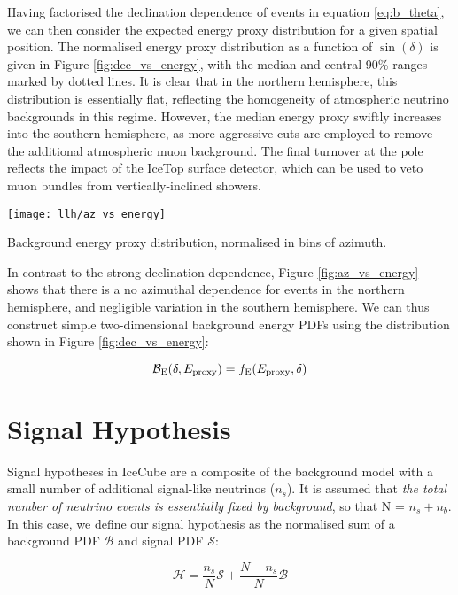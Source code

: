 Having factorised the declination dependence of events in equation \ref{eq:b_theta}, we can then consider the expected energy proxy distribution for a given spatial position. The normalised energy proxy distribution as a function of $\sin(\delta)$ is given in Figure \ref{fig:dec_vs_energy}, with the median and central 90\% ranges marked by dotted lines. It is clear that in the northern hemisphere, this distribution is essentially flat, reflecting the homogeneity of atmospheric neutrino backgrounds in this regime. However, the median energy proxy swiftly increases into the southern hemisphere, as more aggressive cuts are employed to remove the additional atmospheric muon background. The final turnover at the pole reflects the impact of the IceTop surface detector, which can be used to veto muon bundles from vertically-inclined showers.

\begin{marginfigure}
	\centering \texttt{[image: llh/az\_vs\_energy]}
	\caption{Background energy proxy distribution, normalised in bins of azimuth.}
	\label{fig:az_vs_energy}
\end{marginfigure}

In contrast to the strong declination dependence, Figure \ref{fig:az_vs_energy} shows that there is a no azimuthal dependence for events in the northern hemisphere, and negligible variation in the southern hemisphere. We can thus construct simple two-dimensional background energy PDFs using the distribution shown in Figure \ref{fig:dec_vs_energy}:

\begin{equation}
\mathcal{B}_{\textup{E}} (\delta, E_{\textup{proxy}}) = f_{\textup{E}}(E_{\textup{proxy}}, \delta)
\label{eq:b_energy}
\end{equation}

\section{Signal Hypothesis}
\label{sec:signal}

Signal hypotheses in IceCube are a composite of the background model with a small number of additional signal-like neutrinos ($n_{s}$). It is assumed that \emph{the total number of neutrino events is essentially fixed by background}, so that N = $n_{s} + n_{b}$. In this case, we define our signal hypothesis as the normalised sum of a background PDF $\mathcal{B}$ and signal PDF $\mathcal{S}$:

\begin{equation}
\mathcal{H}= \frac{n_{s}}{N} \mathcal{S} + \frac{N - n_{s}}{N} \mathcal{B} 
\label{eq:sig_hypo_single}
\end{equation}

